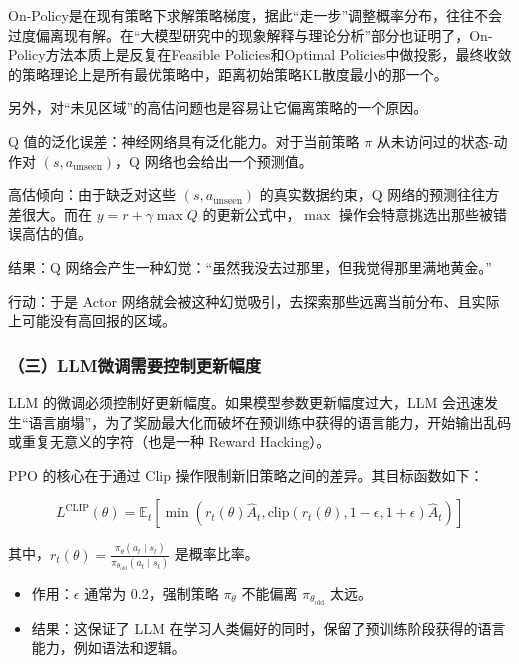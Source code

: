 On-Policy是在现有策略下求解策略梯度，据此``走一步''调整概率分布，往往不会过度偏离现有解。在``大模型研究中的现象解释与理论分析''部分也证明了，On-Policy方法本质上是反复在Feasible Policies和Optimal Policies中做投影，最终收敛的策略理论上是所有最优策略中，距离初始策略KL散度最小的那一个。

另外，对``未见区域''的高估问题也是容易让它偏离策略的一个原因。

Q 值的泛化误差：神经网络具有泛化能力。对于当前策略 \(\pi\) 从未访问过的状态-动作对 \((s,a_{\mathrm{unseen}})\)，Q 网络也会给出一个预测值。

高估倾向：由于缺乏对这些 \((s,a_{\mathrm{unseen}})\) 的真实数据约束，Q 网络的预测往往方差很大。而在 \(y=r+\gamma\max Q\) 的更新公式中，\(\max\) 操作会特意挑选出那些被错误高估的值。

结果：Q 网络会产生一种幻觉：``虽然我没去过那里，但我觉得那里满地黄金。''

行动：于是 Actor 网络就会被这种幻觉吸引，去探索那些远离当前分布、且实际上可能没有高回报的区域。

\hypertarget{ux4e09llmux5faeux8c03ux9700ux8981ux63a7ux5236ux66f4ux65b0ux5e45ux5ea6}{%
\subsubsection{（三）LLM微调需要控制更新幅度}\label{ux4e09llmux5faeux8c03ux9700ux8981ux63a7ux5236ux66f4ux65b0ux5e45ux5ea6}}

LLM 的微调必须控制好更新幅度。如果模型参数更新幅度过大，LLM 会迅速发生``语言崩塌''，为了奖励最大化而破坏在预训练中获得的语言能力，开始输出乱码或重复无意义的字符（也是一种 Reward Hacking）。

PPO 的核心在于通过 Clip 操作限制新旧策略之间的差异。其目标函数如下：

\[
L^{\mathrm{CLIP}}(\theta)
=
\mathbb{E}_t
\left[
\min
\left(
r_t(\theta)\hat{A}_t,
\mathrm{clip}(r_t(\theta),1-\epsilon,1+\epsilon)\hat{A}_t
\right)
\right]
\]

其中，\(r_t(\theta)=\frac{\pi_\theta(a_t\mid s_t)}{\pi_{\theta_{\mathrm{old}}}(a_t\mid s_t)}\) 是概率比率。

\begin{itemize}
\tightlist
\item
  作用：\(\epsilon\) 通常为 0.2，强制策略 \(\pi_\theta\) 不能偏离 \(\pi_{\theta_{\mathrm{old}}}\) 太远。
\item
  结果：这保证了 LLM 在学习人类偏好的同时，保留了预训练阶段获得的语言能力，例如语法和逻辑。
\end{itemize}

